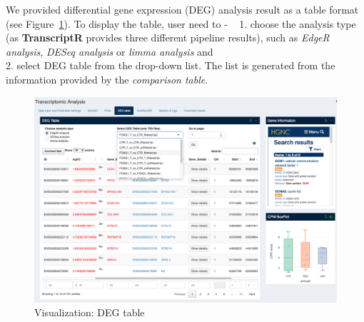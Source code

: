 \documentclass[
  a4paper,
  oneside,
  open=any]{scrreport}
\begin{document}
We provided differential gene expression (DEG) analysis result as a
table format (see Figure~\ref{fig-trans8}). To display the table, user
need to - ~ 1. choose the analysis type (as \textbf{TranscriptR}
provides three different pipeline results), such as \emph{EdgeR
analysis}, \emph{DESeq analysis} or \emph{limma analysis} and\\
2. select DEG table from the drop-down list. The list is generated from
the information provided by the \emph{comparison table}.

\begin{figure}[H]

{\centering \includegraphics{./_images/transcriptome/transcript9.png}

}

\caption{\label{fig-trans8}Visualization: DEG table}

\end{figure}
\end{document}
